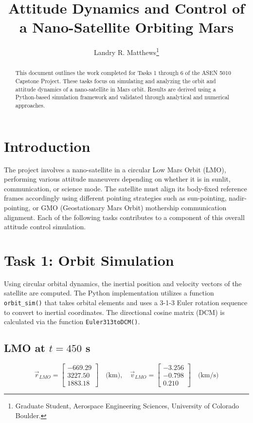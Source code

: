 \documentclass[conf]{new-aiaa}
\title{Attitude Dynamics and Control of a Nano-Satellite Orbiting Mars}
\author{Landry R. Matthews\footnote{Graduate Student, Aerospace Engineering Sciences, University of Colorado Boulder.}}
\affil{University of Colorado Boulder, Boulder, CO, 80309}
\begin{document}
\maketitle

\begin{abstract}
This document outlines the work completed for Tasks 1 through 6 of the ASEN 5010 Capstone Project. These tasks focus on simulating and analyzing the orbit and attitude dynamics of a nano-satellite in Mars orbit. Results are derived using a Python-based simulation framework and validated through analytical and numerical approaches.
\end{abstract}

\section{Introduction}
The project involves a nano-satellite in a circular Low Mars Orbit (LMO), performing various attitude maneuvers depending on whether it is in sunlit, communication, or science mode. The satellite must align its body-fixed reference frames accordingly using different pointing strategies such as sun-pointing, nadir-pointing, or GMO (Geostationary Mars Orbit) mothership communication alignment. Each of the following tasks contributes to a component of this overall attitude control simulation.

\section{Task 1: Orbit Simulation}
Using circular orbital dynamics, the inertial position and velocity vectors of the satellite are computed. The Python implementation utilizes a function \texttt{orbit\_sim()} that takes orbital elements and uses a 3-1-3 Euler rotation sequence to convert to inertial coordinates. The directional cosine matrix (DCM) is calculated via the function \texttt{Euler313toDCM()}.

\subsection*{LMO at $t = 450$ s}
\[
\vec{r}_{LMO} = 
\begin{bmatrix}
-669.29 \\ 3227.50 \\ 1883.18
\end{bmatrix} \quad \text{(km)}, \quad
\vec{v}_{LMO} = 
\begin{bmatrix}
-3.256 \\ -0.798 \\ 0.210
\end{bmatrix} \quad \text{(km/s)}
\]
\end{document}
